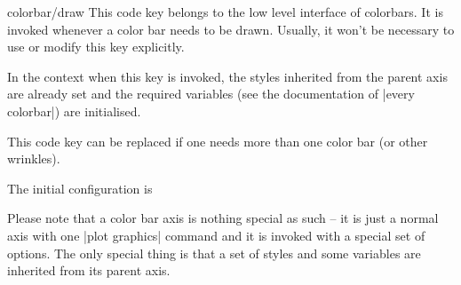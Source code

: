 
\begin{pgfplotscodekey}{colorbar/draw}
	This code key belongs to the low level interface of colorbars. It is invoked whenever a color bar needs to be drawn. Usually, it won't be necessary to use or modify this key explicitly.
	
	In the context when this key is invoked, the styles inherited from the parent axis are already set and the required variables (see the documentation of |every colorbar|) are initialised.

	This code key can be replaced if one needs more than one color bar (or other wrinkles).

	The initial configuration is
\begin{codeexample}
\end{codeexample}

	Please note that a color bar axis is nothing special as such -- it is just a normal axis with one |plot graphics| command and it is invoked with a special set of options. The only special thing is that a set of styles and some variables are inherited from its parent axis.
\end{pgfplotscodekey}

